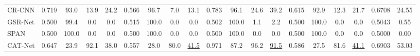 \begin{table*}[ht]
{\begin{tabular}{l|cccc|cccc|cccc|cccc|cc}
CR-CNN \cite{yang2020constrained}    & 0.719                         & 93.0                         & 13.9                         & 24.2                        & 0.566                         & 96.7                        & 7.0                          & 13.1                         & 0.783                         & 96.1                        & 24.6                         & 39.2                         & 0.615                         & 92.9                         & 12.3                         & 21.7                         & 0.6708                         & 24.55                         \\
GSR-Net \cite{zhou2018generate}      & 0.500                         & 99.4                         & 0.0                          & 0.0                         & 0.515                         & 100.0                       & 0.0                          & 0.0                          & 0.502                         & 100.0                       & 1.1                          & 2.2                          & 0.500                         & 100.0                        & 0.0                          & 0.0                          & 0.5043                         & 0.55                          \\
SPAN \cite{hu2020span}               & 0.500                         & 100.0                        & 0.0                          & 0.0                         & 0.500                         & 100.0                       & 0.0                          & 0.0                          & 0.500                         & 100.0                       & 0.0                          & 0.0                          & 0.500                         & 100.0                        & 0.0                          & 0.0                          & 0.5000                         & 0.00                          \\
CAT-Net \cite{kwon2021cat}           & 0.647                         & 23.9                         & 92.1                         & 38.0                        & 0.557                         & 28.0                        & 80.0                         & \underline{41.5}                            & 0.971                         & 87.2                        & 96.2                         & \underline{91.5}                            & 0.586                         & 27.5                         & 81.6                         & \underline{41.1}                            & 0.6903                         & 53.03                         \\

\end{tabular}}
\end{table*}

